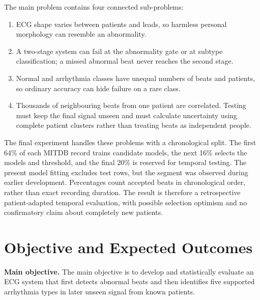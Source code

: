 The main problem contains four connected sub-problems:
\begin{enumerate}
    \item ECG shape varies between patients and leads, so harmless personal
    morphology can resemble an abnormality.
    \item A two-stage system can fail at the abnormality gate or at subtype
    classification; a missed abnormal beat never reaches the second stage.
    \item Normal and arrhythmia classes have unequal numbers of beats and
    patients, so ordinary accuracy can hide failure on a rare class.
    \item Thousands of neighbouring beats from one patient are correlated.
    Testing must keep the final signal unseen and must calculate uncertainty
    using complete patient clusters rather than treating beats as independent
    people.
\end{enumerate}

The final experiment handles these problems with a chronological split. The
first 64\% of each MITDB record trains candidate models, the next 16\% selects
the models and threshold, and the final 20\% is reserved for temporal testing.
The present model fitting excludes test rows, but the segment was observed
during earlier development. Percentages count accepted beats in chronological
order, rather than exact recording duration. The result is therefore a
retrospective patient-adapted temporal evaluation, with possible selection
optimism and no confirmatory claim about completely new patients.

\section{Objective and Expected Outcomes}

\textbf{Main objective.}
The main objective is to develop and statistically evaluate an ECG
system that first detects abnormal beats and then identifies five supported
arrhythmia types in later unseen signal from known patients.

